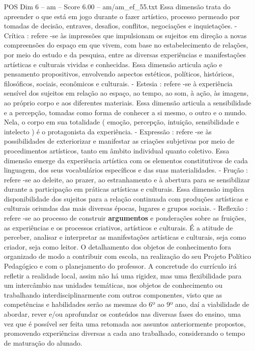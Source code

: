 \begin{textsample}{POS Dim 6 – am – Score 6.00 – am/am\_ef\_55.txt}
Essa dimensão trata do apreender o que está em jogo durante o fazer artístico, processo permeado por tomadas de decisão, entraves, desafios, conflitos, negociações e inquietações. - Crítica : refere -se às impressões que impulsionam os sujeitos em direção a novas compreensões do espaço em que vivem, com base no estabelecimento de relações, por meio do estudo e da pesquisa, entre as diversas experiências e manifestações artísticas e culturais vividas e conhecidas.
Essa dimensão articula ação e pensamento propositivos, envolvendo aspectos estéticos, políticos, históricos, filosóficos, sociais, econômicos e culturais. - Estesia : refere -se à experiência sensível dos sujeitos em relação ao espaço, ao tempo, ao som, à ação, às imagens, ao próprio corpo e aos diferentes materiais.
Essa dimensão articula a sensibilidade e a percepção, tomadas como forma de conhecer a si mesmo, o outro e o mundo.
Nela, o corpo em sua totalidade ( emoção, percepção, intuição, sensibilidade e intelecto ) é o protagonista da experiência. - Expressão : refere -se às possibilidades de exteriorizar e manifestar as criações subjetivas por meio de procedimentos artísticos, tanto em âmbito individual quanto coletivo.
Essa dimensão emerge da experiência artística com os elementos constitutivos de cada linguagem, dos seus vocabulários específicos e das suas materialidades. - Frução : refere -se ao deleite, ao prazer, ao estranhamento e à abertura para se sensibilizar durante a participação em práticas artísticas e culturais.
Essa dimensão implica disponibilidade dos sujeitos para a relação continuada com produções artísticas e culturais oriundas das mais diversas épocas, lugares e grupos sociais. - Reflexão : refere -se ao processo de construir \textbf{argumentos} e ponderações sobre as fruições, as experiências e os processos criativos, artísticos e culturais.
É a atitude de perceber, analisar e interpretar as manifestações artísticas e culturais, seja como criador, seja como leitor.
O detalhamento dos objetos de conhecimento fora organizado de modo a contribuir com escola, na realização do seu Projeto Político Pedagógico e com o planejamento do professor.
A concretude do currículo irá refletir a realidade local, assim não há uma rigidez, mas uma flexibilidade para um intercâmbio nas unidades temáticas, nos objetos de conhecimento ou trabalhando interdisciplinarmente com outros componentes, visto que as competências e habilidades serão as mesmas do 6º ao 9º ano, daí a viabilidade de abordar, rever e/ou aprofundar os conteúdos nas diversas fases do ensino, uma vez que é possível ser feita uma retomada aos assuntos anteriormente propostos, promovendo experiências diversas a cada ano trabalhado, considerando o tempo de maturação do alunado.

\end{textsample}
